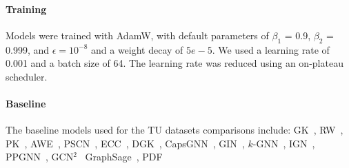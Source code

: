\documentclass{article} \usepackage{iclr2024_conference,times}
\begin{document}
\paragraph{Training}
 Models were trained with AdamW,
with default parameters of $\beta_{1}$ = 0.9, $\beta_{2}$ = 0.999, and $\epsilon = 10^{-8}$ and a weight decay of $5e-5$.
We used a learning rate of 0.001 and a batch size of 64.
The learning rate was reduced using an on-plateau scheduler. 


\begin{table}[h]
    \centering
    \caption{Model training parameters. For the matrix functions the number of poles ($n_p$) and matrix channels ($c$) are indicated}
    \label{tab:model-parameters-pure-graphs}
\end{table}

\paragraph{Baseline}
\label{sec:baseline-tu}
The baseline models used for the TU datasets comparisons include:  
	GK~\citep{shervashidze2009efficient},
	RW~\citep{vishwanathan2010graph},
	PK~\citep{neumann2016propagation},
AWE~\citep{pmlr-v80-ivanov18a},
PSCN~\citep{niepert2016learning},
ECC~\citep{simonovsky2017dynamic},
	DGK~\citep{yanardag2015deep},
	CapsGNN~\citep{xinyi2018capsule},
GIN~\citep{xu2018how},
	$k$-GNN~\citep{morris2019weisfeiler},
	IGN~\citep{maron2018invariant},
	PPGNN~\citep{maron2019provably},
	GCN$^2$~\citep{de2020natural}
	GraphSage~\citep{hamilton2017inductive},
        PDF~\citep{yang2023better}
\end{document}

